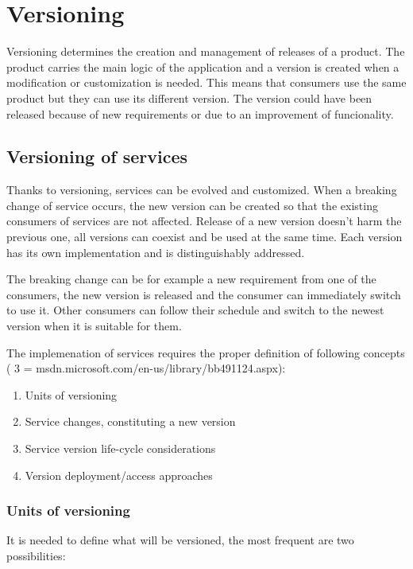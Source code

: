 \chapter{Versioning}
\label{chap:versioning}

Versioning determines the creation and management of releases of a product. The product carries the main logic of the application and a version is created when a modification or customization is needed. This means that consumers use the same product but they can use its different version. The version could have been released because of new requirements or due to an improvement of funcionality. 

\section{Versioning of services}
\label{sec:verioningservices}
Thanks to versioning, services can be evolved and customized. When a breaking change of service occurs, the new version can be created so that the existing consumers of services are not affected. Release of a new version doesn't harm the previous one, all versions can coexist and be used at the same time. Each version has its own implementation and is distinguishably addressed.

The breaking change can be for example a new requirement from one of the consumers, the new version is released and the consumer can immediately switch to use it. Other consumers can follow their schedule and switch to the newest version when it is suitable for them. 

\bigskip 

The implemenation of services requires the proper definition of following concepts ( 3 = msdn.microsoft.com/en-us/library/bb491124.aspx):
\begin{enumerate}
  \item Units of versioning
  \item Service changes, constituting a new version
  \item Service version life-cycle considerations
  \item Version deployment/access approaches
\end{enumerate}

\subsection{Units of versioning}
It is needed to define what will be versioned, the most frequent are two possibilities:

